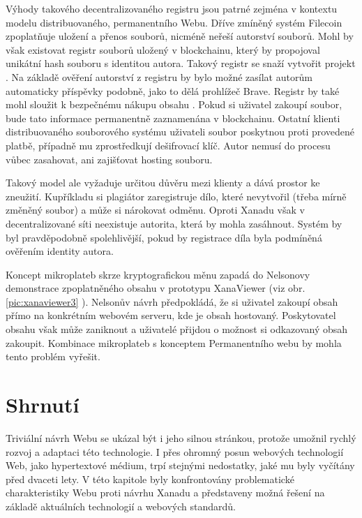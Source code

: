 Výhody takového decentralizovaného registru jsou patrné zejména v kontextu modelu distribuovaného, permanentního Webu. Dříve zmíněný systém Filecoin zpoplatňuje uložení a přenos souborů, nicméně neřeší autorství souborů.
Mohl by však existovat registr souborů uložený v blockchainu, který by propojoval unikátní hash souboru s identitou autora. Takový registr se snaží vytvořit projekt  \autocite{McConaghy2015}. Na základě ověření autorství z registru by bylo možné zasílat autorům automaticky příspěvky podobně, jako to dělá prohlížeč Brave. Registr by také mohl sloužit k bezpečnému nákupu obsahu \autocite{Kahle2015}.
Pokud si uživatel zakoupí soubor, bude tato informace permanentně zaznamenána v blockchainu. Ostatní klienti distribuovaného souborového systému uživateli soubor poskytnou proti provedené platbě, případně mu zprostředkují dešifrovací klíč. Autor nemusí do procesu vůbec zasahovat, ani zajišťovat hosting souboru.

Takový model ale vyžaduje určitou důvěru mezi klienty a dává prostor ke zneužití.
Kupříkladu si plagiátor zaregistruje dílo, které nevytvořil (třeba mírně změněný soubor) a může si nárokovat odměnu. Oproti Xanadu však v decentralizované síti neexistuje autorita, která by mohla zasáhnout. Systém by byl pravděpodobně spolehlivější, pokud by registrace díla byla podmíněná ověřením identity autora.

Koncept mikroplateb skrze kryptografickou měnu zapadá do Nelsonovy demonstrace zpoplatněného obsahu v prototypu XanaViewer (viz obr. \ref{pic:xanaviewer3} ). Nelsonův návrh předpokládá, že si uživatel zakoupí obsah přímo na konkrétním webovém serveru, kde je obsah hostovaný. Poskytovatel obsahu však může zaniknout a uživatelé přijdou o možnost si odkazovaný obsah zakoupit. Kombinace mikroplateb s konceptem Permanentního webu by mohla tento problém vyřešit.

\section{Shrnutí}

Triviální návrh Webu se ukázal být i jeho silnou stránkou, protože umožnil rychlý rozvoj a adaptaci této technologie. I přes ohromný posun webových technologií Web, jako hypertextové médium, trpí stejnými nedostatky, jaké mu byly vyčítány před dvaceti lety. V této kapitole byly konfrontovány problematické charakteristiky Webu proti návrhu Xanadu a představeny možná řešení na základě aktuálních technologií a webových standardů.

